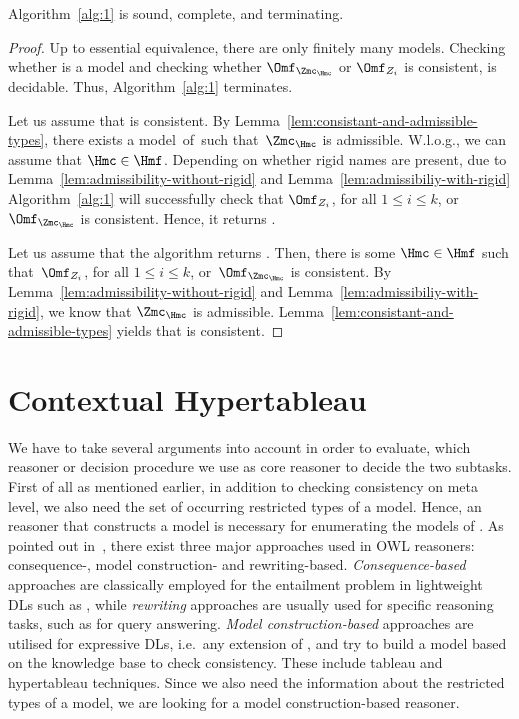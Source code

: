 \begin{lemma}\label{lem:alg1-sound-complete-terminating}
  Algorithm~\ref{alg:1} is sound, complete, and terminating.
\end{lemma}
\begin{proof}
  Up to essential equivalence, there are only finitely many models. Checking whether \Hmc is a model and checking whether
  $\Omf_{\Zmc_{\Hmc}}$ or $\Omf_{Z_{i}}$ is consistent, is decidable. Thus, Algorithm~\ref{alg:1}
  terminates.

  Let us assume that \Bmf is consistent. By Lemma~\ref{lem:consistant-and-admissible-types}, there
  exists a model~\Hmc of~\Bmfb such that~$\Zmc_{\Hmc}$ is admissible. W.l.o.g., we can assume that
  $\Hmc\in\Hmf$. 
  Depending on whether rigid names are present, due to
  Lemma~\ref{lem:admissibility-without-rigid} and Lemma~\ref{lem:admissibiliy-with-rigid} Algorithm~\ref{alg:1} will successfully check that
  $\Omf_{Z_{i}}$, for all $1\leq i \leq k$, or $\Omf_{\Zmc_{\Hmc}}$ is consistent. Hence, it
  returns \true.

  Let us assume that the algorithm returns \true. Then, there is some $\Hmc\in\Hmf$ such that~$\Omf_{Z_{i}}$,
  for all $1\leq i \leq k$, or~$\Omf_{\Zmc_{\Hmc}}$ is consistent. By
  Lemma~\ref{lem:admissibility-without-rigid} and Lemma~\ref{lem:admissibiliy-with-rigid}, we know
  that $\Zmc_{\Hmc}$ is admissible. Lemma~\ref{lem:consistant-and-admissible-types} yields that \Bmf
  is consistent.
\end{proof}



\section{Contextual Hypertableau}
\label{sec:using-hypertableau}

We have to take several arguments into account in order to evaluate, which reasoner or decision
procedure we use as core reasoner to decide the two subtasks.
%
First of all as mentioned earlier, in addition to checking consistency on meta level, we also need
the set of occurring restricted types of a model. Hence, an reasoner that constructs a model is
necessary for enumerating the models of \Bmfb. As pointed out in~\cite{MaLHSP-ORE15}, there exist
three major approaches used in OWL reasoners: consequence-, model construction- and
rewriting-based. \emph{Consequence-based} approaches are classically employed for the entailment
problem in lightweight DLs such as \EL, while \emph{rewriting} approaches are usually used for
specific reasoning tasks, such as for query answering. \emph{Model construction-based} approaches
are utilised for expressive DLs, i.e.\ any extension of \ALC, and try to build a model based on the
knowledge base to check consistency. These include tableau and hypertableau techniques. Since we
also need the information about the restricted types of a model, we are looking for a model
construction-based reasoner.

